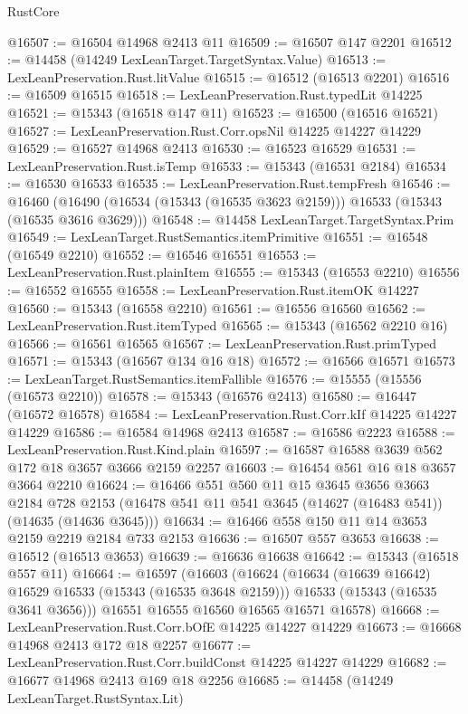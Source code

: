 \begin{lexlean}{RustCore}
\begin{coremodule}
@16507 := @16504 @14968 @2413 @11
@16509 := @16507 @147 @2201
@16512 := @14458 (@14249 LexLeanTarget.TargetSyntax.Value)
@16513 := LexLeanPreservation.Rust.litValue
@16515 := @16512 (@16513 @2201)
@16516 := @16509 @16515
@16518 := LexLeanPreservation.Rust.typedLit @14225
@16521 := @15343 (@16518 @147 @11)
@16523 := @16500 (@16516 @16521)
@16527 := LexLeanPreservation.Rust.Corr.opsNil @14225 @14227 @14229
@16529 := @16527 @14968 @2413
@16530 := @16523 @16529
@16531 := LexLeanPreservation.Rust.isTemp
@16533 := @15343 (@16531 @2184)
@16534 := @16530 @16533
@16535 := LexLeanPreservation.Rust.tempFresh
@16546 := @16460
    (@16490 (@16534 (@15343 (@16535 @3623 @2159))) @16533 (@15343 (@16535 @3616 @3629)))
@16548 := @14458 LexLeanTarget.TargetSyntax.Prim
@16549 := LexLeanTarget.RustSemantics.itemPrimitive
@16551 := @16548 (@16549 @2210)
@16552 := @16546 @16551
@16553 := LexLeanPreservation.Rust.plainItem
@16555 := @15343 (@16553 @2210)
@16556 := @16552 @16555
@16558 := LexLeanPreservation.Rust.itemOK @14227
@16560 := @15343 (@16558 @2210)
@16561 := @16556 @16560
@16562 := LexLeanPreservation.Rust.itemTyped
@16565 := @15343 (@16562 @2210 @16)
@16566 := @16561 @16565
@16567 := LexLeanPreservation.Rust.primTyped
@16571 := @15343 (@16567 @134 @16 @18)
@16572 := @16566 @16571
@16573 := LexLeanTarget.RustSemantics.itemFallible
@16576 := @15555 (@15556 (@16573 @2210))
@16578 := @15343 (@16576 @2413)
@16580 := @16447 (@16572 @16578)
@16584 := LexLeanPreservation.Rust.Corr.kIf @14225 @14227 @14229
@16586 := @16584 @14968 @2413
@16587 := @16586 @2223
@16588 := LexLeanPreservation.Rust.Kind.plain
@16597 := @16587 @16588 @3639 @562 @172 @18 @3657 @3666 @2159 @2257
@16603 := @16454 @561 @16 @18 @3657 @3664 @2210
@16624 := @16466
    @551
    @560
    @11
    @15
    @3645
    @3656
    @3663
    @2184
    @728
    @2153
    (@16478 @541 @11 @541 @3645 (@14627 (@16483 @541)) (@14635 (@14636 @3645)))
@16634 := @16466 @558 @150 @11 @14 @3653 @2159 @2219 @2184 @733 @2153
@16636 := @16507 @557 @3653
@16638 := @16512 (@16513 @3653)
@16639 := @16636 @16638
@16642 := @15343 (@16518 @557 @11)
@16664 := @16597
    (@16603
      (@16624
        (@16634 (@16639 @16642) @16529 @16533 (@15343 (@16535 @3648 @2159)))
        @16533
        (@15343 (@16535 @3641 @3656)))
      @16551
      @16555
      @16560
      @16565
      @16571
      @16578)
@16668 := LexLeanPreservation.Rust.Corr.bOfE @14225 @14227 @14229
@16673 := @16668 @14968 @2413 @172 @18 @2257
@16677 := LexLeanPreservation.Rust.Corr.buildConst @14225 @14227 @14229
@16682 := @16677 @14968 @2413 @169 @18 @2256
@16685 := @14458 (@14249 LexLeanTarget.RustSyntax.Lit)

\end{coremodule}
\end{lexlean}
